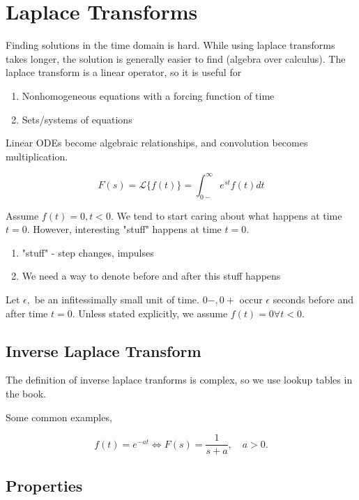 \documentclass[12pt, a4paper]{report}
\begin{document}
  \newpage

  \section{Laplace Transforms}
  Finding solutions in the time domain is hard. While using laplace transforms takes longer, the solution is generally easier to find (algebra over calculus). The laplace transform is a linear operator, so it is useful for

  \begin{enumerate}
    \item Nonhomogeneous equations with a forcing function of time
    \item Sets/systems of equations
  \end{enumerate}

  Linear ODEs become algebraic relationships, and convolution becomes multiplication.

  \begin{equation}
    F(s) = \mathcal{L}\{f(t)\} = \int_{0-}^{\infty} e^{st} f(t)dt
  \end{equation}

  Assume $ f(t) = 0, t < 0. $ We tend to start caring about what happens at time $ t = 0. $ However, interesting "stuff" happens at time $ t = 0. $

  \begin{enumerate}
    \item "stuff" - step changes, impulses
    \item We need a way to denote before and after this stuff happens
  \end{enumerate}

  Let $ \epsilon, $ be an infitessimally small unit of time. $ 0-, 0+ $ occur $ \epsilon $ seconds before and after time $ t = 0. $ Unless stated explicitly, we assume $ f(t) = 0 \forall t < 0. $

  \subsection{Inverse Laplace Transform}

  The definition of inverse laplace tranforms is complex, so we use lookup tables in the book.

  Some common examples,

  \[
      f(t) = e^{-at} \iff F(s) = \frac{1}{s + a}, \quad a > 0
    .\]

  \subsection{Properties}
\end{document}
